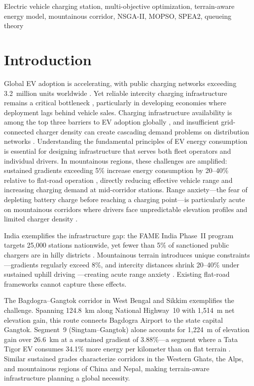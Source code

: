 \documentclass[conference]{IEEEtran}
\begin{document}
\begin{IEEEkeywords}
Electric vehicle charging station, multi-objective optimization, terrain-aware energy model, mountainous corridor, NSGA-II, MOPSO, SPEA2, queueing theory
\end{IEEEkeywords}

\section{Introduction}
\label{sec:intro}

Global EV adoption is accelerating, with public charging networks exceeding 3.2~million units worldwide \cite{1}. Yet reliable intercity charging infrastructure remains a critical bottleneck \cite{2}, particularly in developing economies where deployment lags behind vehicle sales. Charging infrastructure availability is among the top three barriers to EV adoption globally \cite{3}, and insufficient grid-connected charger density can create cascading demand problems on distribution networks \cite{4}. Understanding the fundamental principles of EV energy consumption \cite{5} is essential for designing infrastructure that serves both fleet operators and individual drivers. In mountainous regions, these challenges are amplified: sustained gradients exceeding 5\% increase energy consumption by 20--40\% relative to flat-road operation \cite{10,12}, directly reducing effective vehicle range and increasing charging demand at mid-corridor stations. Range anxiety---the fear of depleting battery charge before reaching a charging point---is particularly acute on mountainous corridors where drivers face unpredictable elevation profiles and limited charger density \cite{7,9}.

India exemplifies the infrastructure gap: the FAME India Phase~II program \cite{6} targets 25{,}000 stations nationwide, yet fewer than 5\% of sanctioned public chargers are in hilly districts \cite{7}. Mountainous terrain introduces unique constraints---gradients regularly exceed 8\%, and intercity distances shrink 20--40\% under sustained uphill driving \cite{5,8}---creating acute range anxiety \cite{7,9}. Existing flat-road frameworks \cite{13,14,15,16,17} cannot capture these effects.

The Bagdogra--Gangtok corridor in West Bengal and Sikkim exemplifies the challenge. Spanning 124.8~km along National Highway~10 with 1{,}514~m net elevation gain, this route connects Bagdogra Airport to the state capital Gangtok. Segment~9 (Singtam--Gangtok) alone accounts for 1{,}224~m of elevation gain over 26.6~km at a sustained gradient of 3.88\%---a segment where a Tata Tigor EV consumes 34.1\% more energy per kilometer than on flat terrain \cite{10,11,12}. Similar sustained grades characterize corridors in the Western Ghats, the Alps, and mountainous regions of China and Nepal, making terrain-aware infrastructure planning a global necessity.
\end{document}

